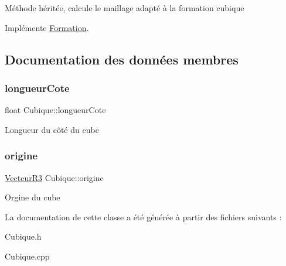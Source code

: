 Méthode héritée, calcule le maillage adapté à la formation cubique 

Implémente \mbox{\hyperlink{class_formation_ad1044228c0a1a4ee585ffe7f615c06ea}{Formation}}.



\subsection{Documentation des données membres}
\mbox{\label{class_cubique_a2d8ca11e6bf2f6b73aad6ca1f595990e}} 
\subsubsection{\texorpdfstring{longueur\+Cote}{longueurCote}}
{\footnotesize\ttfamily float Cubique\+::longueur\+Cote\hspace{0.3cm}{\ttfamily [protected]}}

Longueur du côté du cube \mbox{\label{class_cubique_ab9d0ac86eeba76c72022bd84c401bb59}} 
\subsubsection{\texorpdfstring{origine}{origine}}
{\footnotesize\ttfamily \mbox{\hyperlink{class_vecteur_r3}{Vecteur\+R3}} Cubique\+::origine\hspace{0.3cm}{\ttfamily [protected]}}

Orgine du cube 

La documentation de cette classe a été générée à partir des fichiers suivants \+:\begin{DoxyCompactItemize}
\item 
Cubique.\+h\item 
Cubique.\+cpp\end{DoxyCompactItemize}
